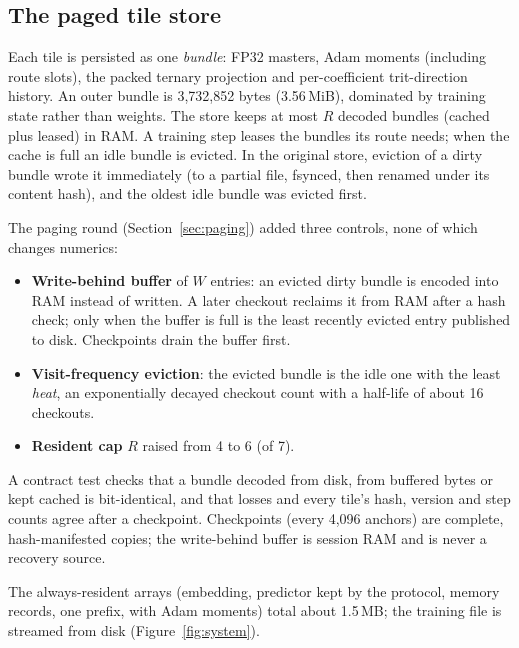 \documentclass[10pt]{article}
\begin{document}
\subsection{The paged tile store}
\label{sec:store}

Each tile is persisted as one \emph{bundle}: FP32 masters, Adam moments (including route slots), the
packed ternary projection and per-coefficient trit-direction history. An outer bundle is 3,732,852
bytes (3.56\,MiB), dominated by training state rather than weights. The store keeps at most $R$
decoded bundles (cached plus leased) in RAM. A training step leases the bundles its route needs;
when the cache is full an idle bundle is evicted. In the original store, eviction of a dirty bundle
wrote it immediately (to a partial file, fsynced, then renamed under its content hash), and the
oldest idle bundle was evicted first.

The paging round (Section~\ref{sec:paging}) added three controls, none of which changes numerics:
\begin{itemize}[leftmargin=*,itemsep=2pt]
  \item \textbf{Write-behind buffer} of $W$ entries: an evicted dirty bundle is encoded into RAM
  instead of written. A later checkout reclaims it from RAM after a hash check; only when the buffer
  is full is the least recently evicted entry published to disk. Checkpoints drain the buffer first.
  \item \textbf{Visit-frequency eviction}: the evicted bundle is the idle one with the least
  \emph{heat}, an exponentially decayed checkout count with a half-life of about 16 checkouts.
  \item \textbf{Resident cap} $R$ raised from 4 to 6 (of 7).
\end{itemize}
A contract test checks that a bundle decoded from disk, from buffered bytes or kept cached is
bit-identical, and that losses and every tile's hash, version and step counts agree after a
checkpoint. Checkpoints (every 4,096 anchors) are complete, hash-manifested copies; the write-behind
buffer is session RAM and is never a recovery source.

The always-resident arrays (embedding, predictor kept by the protocol, memory records, one
prefix, with Adam moments) total about 1.5\,MB; the training file is streamed from disk
(Figure~\ref{fig:system}).
\end{document}
